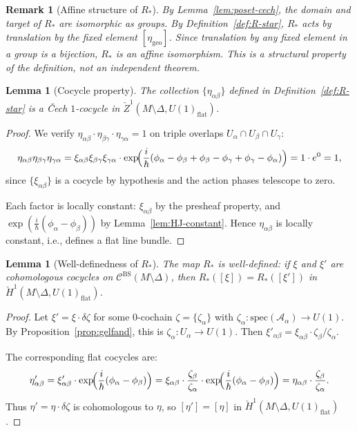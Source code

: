 \documentclass[11pt]{article}
\newtheorem{lemma}[theorem]{Lemma}
\newtheorem{remark}[theorem]{Remark}
\begin{document}
\begin{remark}[Affine structure of $R_*$]
\label{rem:affine-structure}
By Lemma~\ref{lem:poset-cech}, the domain and target of $R_*$ are isomorphic as groups.
By Definition~\ref{def:R-star}, $R_*$ acts by translation by the fixed element
$[\eta_{\mathrm{geo}}]$. Since translation by any fixed element in a group is a bijection,
$R_*$ is an affine isomorphism. This is a structural property of the definition,
not an independent theorem.
\end{remark}

\begin{lemma}[Cocycle property]
\label{lem:cocycle}
The collection $\{\eta_{\alpha\beta}\}$ defined in Definition~\ref{def:R-star}
is a \v{C}ech $1$-cocycle in $\check{Z}^1(M \setminus \Delta, U(1)_{\mathrm{flat}})$.
\end{lemma}

\begin{proof}
We verify $\eta_{\alpha\beta} \cdot \eta_{\beta\gamma} \cdot \eta_{\gamma\alpha} = 1$
on triple overlaps $U_\alpha \cap U_\beta \cap U_\gamma$:
\[
\eta_{\alpha\beta} \eta_{\beta\gamma} \eta_{\gamma\alpha}
= \xi_{\alpha\beta}\xi_{\beta\gamma}\xi_{\gamma\alpha} \cdot
\exp\!\Bigl(\frac{i}{\hbar}(\phi_\alpha - \phi_\beta + \phi_\beta - \phi_\gamma + \phi_\gamma - \phi_\alpha)\Bigr)
= 1 \cdot e^0 = 1,
\]
since $\{\xi_{\alpha\beta}\}$ is a cocycle by hypothesis and the action
phases telescope to zero.

Each factor is locally constant: $\xi_{\alpha\beta}$ by the presheaf
property, and $\exp(\frac{i}{\hbar}(\phi_\alpha - \phi_\beta))$ by
Lemma~\ref{lem:HJ-constant}. Hence $\eta_{\alpha\beta}$ is locally constant,
i.e., defines a flat line bundle.
\end{proof}

\begin{lemma}[Well-definedness of $R_*$]
\label{lem:R-star-well-defined}
The map $R_*$ is well-defined: if $\xi$ and $\xi'$ are cohomologous cocycles
on $\mathcal{C}^{\mathrm{BS}}(M \setminus \Delta)$, then $R_*([\xi]) = R_*([\xi'])$
in $\check{H}^1(M \setminus \Delta, U(1)_{\mathrm{flat}})$.
\end{lemma}

\begin{proof}
Let $\xi' = \xi \cdot \delta\zeta$ for some $0$-cochain
$\zeta = \{\zeta_\alpha\}$ with $\zeta_\alpha: \mathrm{spec}(\mathcal{A}_\alpha) \to U(1)$.
By Proposition~\ref{prop:gelfand}, this is $\zeta_\alpha: U_\alpha \to U(1)$.
Then $\xi'_{\alpha\beta} = \xi_{\alpha\beta} \cdot \zeta_\beta / \zeta_\alpha$.

The corresponding flat cocycles are:
\[
\eta'_{\alpha\beta}
= \xi'_{\alpha\beta} \cdot \exp\!\Bigl(\frac{i}{\hbar}(\phi_\alpha - \phi_\beta)\Bigr)
= \xi_{\alpha\beta} \cdot \frac{\zeta_\beta}{\zeta_\alpha} \cdot
\exp\!\Bigl(\frac{i}{\hbar}(\phi_\alpha - \phi_\beta)\Bigr)
= \eta_{\alpha\beta} \cdot \frac{\zeta_\beta}{\zeta_\alpha}.
\]
Thus $\eta' = \eta \cdot \delta\zeta$ is cohomologous to $\eta$,
so $[\eta'] = [\eta]$ in $\check{H}^1(M \setminus \Delta, U(1)_{\mathrm{flat}})$.
\end{proof}
\end{document}
